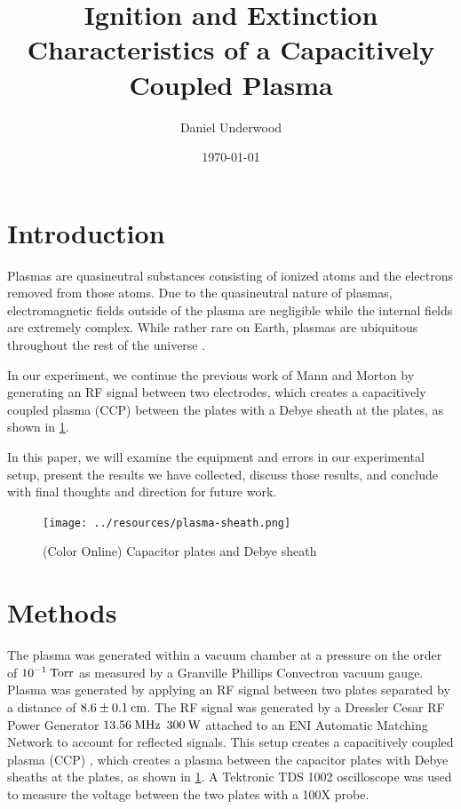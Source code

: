 \documentclass[reprint]{revtex4-1}
\begin{document}
\title{Ignition and Extinction Characteristics of a Capacitively Coupled Plasma}
\author{Daniel Underwood}
\date{\today}

\begin{abstract}

\end{abstract}
\maketitle

\section{Introduction}
Plasmas are quasineutral substances consisting of ionized atoms and the electrons removed from those atoms. Due to the quasineutral nature of plasmas, electromagnetic fields outside of the plasma are negligible while the internal fields are extremely complex. While rather rare on Earth, plasmas are ubiquitous throughout the rest of the universe \cite{F.F.Chen1989}.

In our experiment, we continue the previous work of Mann and Morton \cite{Mann2015} by generating an RF signal between two electrodes, which creates a capacitively coupled plasma (CCP) between the plates with a Debye sheath at the plates, as shown in \cref{fig:plasma-sheath}.

In this paper, we will examine the equipment and errors in our experimental setup, present the results we have collected, discuss those results, and conclude with final thoughts and direction for future work.

\begin{figure}[h]
\texttt{[image: ../resources/plasma-sheath.png]}
\caption{(Color Online) Capacitor plates and Debye sheath}
\label{fig:plasma-sheath}
\end{figure}

\section{Methods}

The plasma was generated within a vacuum chamber at a pressure on the order of $10^{-1}\:\rm{Torr}$ as measured by a Granville Phillips Convectron vacuum gauge. Plasma was generated by applying an RF signal between two plates separated by a distance of $8.6 \pm 0.1\:\rm{cm}$. The RF signal was generated by a Dressler Cesar RF Power Generator $13.56\:\rm{MHz}$ $300\:\rm{W}$ attached to an ENI Automatic Matching Network to account for reflected signals. This setup creates a capacitively coupled plasma (CCP) \cite{physics-radio-frequency}, which creates a plasma between the capacitor plates with Debye sheaths at the plates, as shown in \cref{fig:plasma-sheath}.  A Tektronic TDS 1002 oscilloscope was used to measure the voltage between the two plates with a 100X probe.
\end{document}
